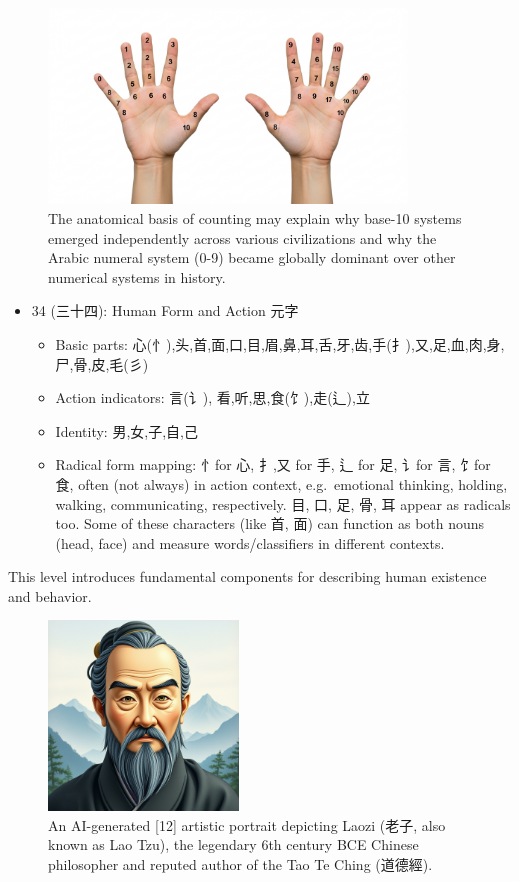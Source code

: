 \documentclass[11pt,letterpaper]{article}
\begin{document}
\begin{figure}
\centering
\includegraphics[width=0.85\textwidth]{./images/10-fingers.jpg}
\caption{The anatomical basis of counting may explain why base-10
systems emerged independently across various civilizations and why the
Arabic numeral system (0-9) became globally dominant over other
numerical systems in history.}
\end{figure}

\begin{itemize}
\tightlist
\item
  34 (三十四): Human Form and Action 元字

  \begin{itemize}
  \tightlist
  \item
    Basic parts:
    心(忄),头,首,面,口,目,眉,鼻,耳,舌,牙,齿,手(扌),又,足,血,肉,身,尸,骨,皮,毛(彡)
  \item
    Action indicators: 言(讠), 看,听,思,食(饣),走(辶),立
  \item
    Identity: 男,女,子,自,己
  \item
    Radical form mapping: 忄for 心, 扌,又 for 手, 辶 for 足, 讠for 言,
    饣for 食, often (not always) in action context, e.g.~emotional
    thinking, holding, walking, communicating, respectively. 目, 口, 足,
    骨, 耳 appear as radicals too. Some of these characters (like 首,
    面) can function as both nouns (head, face) and measure
    words/classifiers in different contexts.
  \end{itemize}
\end{itemize}

This level introduces fundamental components for describing human
existence and behavior.

\begin{figure}
\centering
\includegraphics[width=0.45\textwidth]{./images/laozi-qwen-max.png}
\caption{An AI-generated {[}12{]} artistic portrait depicting Laozi
(老子, also known as Lao Tzu), the legendary 6th century BCE Chinese
philosopher and reputed author of the Tao Te Ching (道德經).}
\end{figure}
\end{document}
